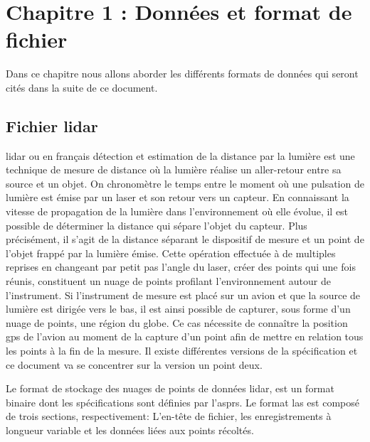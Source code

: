 \chapter{Chapitre 1 : Données et format de fichier}


Dans ce chapitre nous allons aborder les différents formats de données qui seront
cités dans la suite de ce document.

\section{Fichier lidar}

\gls{lidar} ou en français 
détection et estimation de la distance par la lumière est une technique de mesure de distance où la lumière réalise un 
aller-retour entre sa source et un objet. On chronomètre le temps entre le moment 
où une pulsation de lumière est émise par un laser et son retour vers un capteur.
En connaissant la vitesse de propagation de la lumière dans l’environnement où elle
évolue, il est possible de déterminer la distance qui sépare l’objet 
du capteur. Plus précisément, il s’agit de la distance séparant le dispositif de
mesure et un point de l’objet frappé par la lumière émise. 
Cette opération effectuée à de multiples reprises en changeant par petit pas 
l’angle du laser, créer des points qui une fois réunis,
constituent un nuage de points profilant l'environnement autour de l'instrument.
Si l'instrument de mesure est placé sur un avion et que la source de lumière est
dirigée vers le bas, il est ainsi possible de capturer, sous forme d'un nuage de
points, une région du globe. Ce cas nécessite de connaître la position
\gls{gps} de l'avion au moment de la capture d'un point afin de mettre en relation
tous les points à la fin de la mesure.
Il existe différentes versions de la spécification et ce document va se concentrer sur la version un point deux.

Le format de stockage des nuages de points de données \gls{lidar}, est un format
binaire dont les spécifications sont définies par l'\gls{asprs}.
Le format \gls{las} est composé de trois sections, respectivement:
L'en-tête de fichier, les enregistrements à longueur variable et les données liées aux points récoltés.

